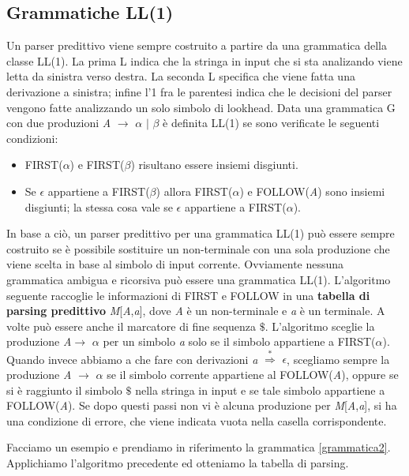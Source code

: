 \subsection{Grammatiche LL(1)}
Un parser predittivo viene sempre costruito a partire da una grammatica della classe LL(1). La prima L \cite{libro: compilatori} indica che la stringa in input che si sta analizando viene letta da sinistra verso destra. La seconda L specifica che viene fatta una derivazione a sinistra; infine l'1 fra le parentesi indica che le decisioni del parser vengono fatte analizzando un solo simbolo di lookhead. Data una grammatica G con due produzioni \textit{A} $\to$ $\alpha$ $\mid$ $\beta$ è definita LL(1) se sono verificate le seguenti condizioni:
\begin{itemize}
	\item FIRST($\alpha$) e FIRST($\beta$) risultano essere insiemi disgiunti.
	\item Se $\epsilon$ appartiene a FIRST($\beta$) allora FIRST($\alpha$) e FOLLOW(\textit{A}) sono insiemi disgiunti; la stessa cosa vale se $\epsilon$ appartiene a FIRST($\alpha$).
\end{itemize}
In base a ciò, un parser predittivo per una grammatica LL(1) può essere sempre costruito se è possibile sostituire un non-terminale con una sola produzione che viene scelta in base al simbolo di input corrente. Ovviamente nessuna grammatica ambigua e ricorsiva può essere una grammatica LL(1). L'algoritmo seguente raccoglie le informazioni di FIRST e FOLLOW in una \textbf{tabella di parsing predittivo} \textit{M}[\textit{A},\textit{a}], dove \textit{A} è un non-terminale e \textit{a} è un terminale. A volte può essere anche il marcatore di fine sequenza $\$$. L'algoritmo sceglie la produzione \textit{A}$\to$ $\alpha$ per un simbolo \textit{a} solo se il simbolo appartiene a FIRST($\alpha$). Quando invece abbiamo a che fare con derivazioni \textit{a} $\overset{*}{\Rightarrow}$ $\epsilon$, scegliamo sempre la produzione \textit{A} $\to$ $\alpha$ se il simbolo corrente appartiene al FOLLOW(\textit{A}), oppure se si è raggiunto il simbolo $\$$ nella stringa in input e se tale simbolo appartiene a FOLLOW(\textit{A}). Se dopo questi passi non vi è alcuna produzione per \textit{M}[\textit{A},\textit{a}], si ha una condizione di errore, che viene indicata vuota nella casella corrispondente.\par 
\noindent Facciamo un esempio e prendiamo in riferimento la grammatica \ref{grammatica2}. Applichiamo l'algoritmo precedente ed otteniamo la tabella di parsing.\par
